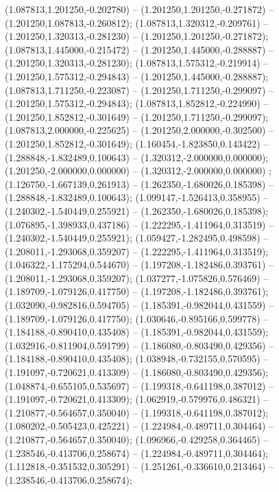 (1.087813,1.201250,-0.202780) -- (1.201250,1.201250,-0.271872) -- (1.201250,1.087813,-0.260812);
 (1.087813,1.320312,-0.209761) -- (1.201250,1.320313,-0.281230) -- (1.201250,1.201250,-0.271872);
 (1.087813,1.445000,-0.215472) -- (1.201250,1.445000,-0.288887) -- (1.201250,1.320313,-0.281230);
 (1.087813,1.575312,-0.219914) -- (1.201250,1.575312,-0.294843) -- (1.201250,1.445000,-0.288887);
 (1.087813,1.711250,-0.223087) -- (1.201250,1.711250,-0.299097) -- (1.201250,1.575312,-0.294843);
 (1.087813,1.852812,-0.224990) -- (1.201250,1.852812,-0.301649) -- (1.201250,1.711250,-0.299097);
 (1.087813,2.000000,-0.225625) -- (1.201250,2.000000,-0.302500) -- (1.201250,1.852812,-0.301649);
 (1.160454,-1.823850,0.143422) -- (1.288848,-1.832489,0.100643) -- (1.320312,-2.000000,0.000000);
 (1.201250,-2.000000,0.000000) -- (1.320312,-2.000000,0.000000) ;
 (1.126750,-1.667139,0.261913) -- (1.262350,-1.680026,0.185398) -- (1.288848,-1.832489,0.100643);
 (1.099147,-1.526413,0.358955) -- (1.240302,-1.540449,0.255921) -- (1.262350,-1.680026,0.185398);
 (1.076895,-1.398933,0.437186) -- (1.222295,-1.411964,0.313519) -- (1.240302,-1.540449,0.255921);
 (1.059427,-1.282495,0.498598) -- (1.208011,-1.293068,0.359207) -- (1.222295,-1.411964,0.313519);
 (1.046322,-1.175294,0.544670) -- (1.197208,-1.182486,0.393761) -- (1.208011,-1.293068,0.359207);
 (1.037277,-1.075826,0.576469) -- (1.189709,-1.079126,0.417750) -- (1.197208,-1.182486,0.393761);
 (1.032090,-0.982816,0.594705) -- (1.185391,-0.982044,0.431559) -- (1.189709,-1.079126,0.417750);
 (1.030646,-0.895166,0.599778) -- (1.184188,-0.890410,0.435408) -- (1.185391,-0.982044,0.431559);
 (1.032916,-0.811904,0.591799) -- (1.186080,-0.803490,0.429356) -- (1.184188,-0.890410,0.435408);
 (1.038948,-0.732155,0.570595) -- (1.191097,-0.720621,0.413309) -- (1.186080,-0.803490,0.429356);
 (1.048874,-0.655105,0.535697) -- (1.199318,-0.641198,0.387012) -- (1.191097,-0.720621,0.413309);
 (1.062919,-0.579976,0.486321) -- (1.210877,-0.564657,0.350040) -- (1.199318,-0.641198,0.387012);
 (1.080202,-0.505423,0.425221) -- (1.224984,-0.489711,0.304464) -- (1.210877,-0.564657,0.350040);
 (1.096966,-0.429258,0.364465) -- (1.238546,-0.413706,0.258674) -- (1.224984,-0.489711,0.304464);
 (1.112818,-0.351532,0.305291) -- (1.251261,-0.336610,0.213464) -- (1.238546,-0.413706,0.258674);
